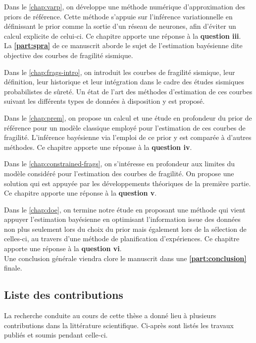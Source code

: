 \noindent
Dans le \cref{chap:varp}, on développe une méthode numérique d'approximation des priors de référence. Cette méthode s'appuie sur l'inférence variationnelle en définissant le prior comme la sortie d'un réseau de neurones, afin d'éviter un calcul explicite de celui-ci. Ce chapitre apporte une réponse à la \textbf{question iii}. \\


La \textbf{\cref{part:spra}} de ce manuscrit aborde le sujet de l'estimation bayésienne dite objective des courbes de fragilité sismique.

\noindent
Dans le \cref{chap:frags-intro}, on introduit les courbes de fragilité sismique, leur définition, leur historique et leur intégration dans le cadre des études sismiques probabilistes de sûreté. Un état de l'art des méthodes d'estima\-tion de ces courbes suivant les différents types de données à disposition y est proposé.

\noindent
Dans le \cref{chap:prem}, on propose un calcul et une étude en profondeur du prior de référence pour un modèle classique employé pour l'estimation de ces courbes de fragilité. L'inférence bayésienne via l'emploi de ce prior y est comparée à d'autres méthodes. Ce chapitre apporte une réponse à la \textbf{question iv}.

\noindent
Dans le \cref{chap:constrained-frags}, on s'intéresse en profondeur aux limites du modèle considéré pour l'estimation des courbes de fragilité. On propose une solution qui est appuyée par les développements théoriques de la première partie. Ce chapitre apporte une réponse à la \textbf{question v}.

\noindent
Dans le \cref{chap:doe}, on termine notre étude en proposant une méthode qui vient appuyer l'estimation bayésienne en optimisant l'information issue des données non plus seulement  lors du choix du prior mais également lors de la sélection de celles-ci, au travers d'une méthode de planification d'expériences. Ce chapitre apporte une réponse à la \textbf{question vi}.\\


Une conclusion générale viendra clore le manuscrit dans une \textbf{\cref{part:conclusion}} finale.


\subsection{Liste des contributions}

La recherche conduite au cours de cette thèse a donné lieu à plusieurs contributions dans la littérature scientifique. Ci-après sont listés les travaux publiés et soumis pendant celle-ci.

